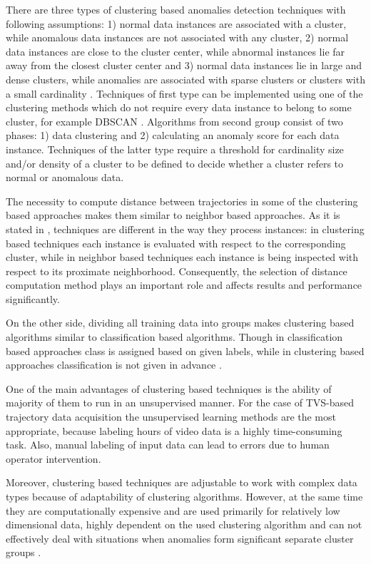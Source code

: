 There are three types of clustering based anomalies detection techniques with following assumptions: 1) normal data instances are associated with a cluster, while anomalous data instances are not associated with any cluster, 2) normal data instances are close to the cluster center, while abnormal instances lie far away from the closest cluster center and 3) normal data instances lie in large and dense clusters, while anomalies are associated with sparse clusters or clusters with a small cardinality \cite{article:15_survey_ad}\cite{article:6_survey_anom_det_rtuvs}. Techniques of first type can be implemented using one of the clustering methods which do not require every data instance to belong to some cluster, for example DBSCAN \cite{inproceedings:20_dbscan}. Algorithms from second group consist of two phases: 1) data clustering and 2) calculating an anomaly score for each data instance. Techniques of the latter type require a threshold for cardinality size and/or density of a cluster to be defined to decide whether a cluster refers to normal or anomalous data.

The necessity to compute distance between trajectories in some of the clustering based approaches makes them similar to neighbor based approaches. As it is stated in \cite{article:15_survey_ad}, techniques are different in the way they process instances: in clustering based techniques each instance is evaluated with respect to the corresponding cluster, while in neighbor based techniques each instance is being inspected with respect to its proximate neighborhood. Consequently, the selection of distance computation method plays an important role and affects results and performance significantly.

On the other side, dividing all training data into groups makes clustering based algorithms similar to classification based algorithms. Though in classification based approaches class is assigned based on given labels, while in clustering based approaches classification is not given in advance \cite{inproceedings:18_ardod_lstd}.

One of the main advantages of clustering based techniques is the ability of majority of them to run in an unsupervised manner. For the case of TVS-based trajectory data acquisition the unsupervised learning methods are the most appropriate, because labeling hours of video data is a highly time-consuming task. Also, manual labeling of input data can lead to errors due to human operator intervention.

Moreover, clustering based techniques are adjustable to work with complex data types because of adaptability of clustering algorithms. However, at the same time they are computationally expensive and are used primarily for relatively low dimensional data, highly dependent on the used clustering algorithm and can not effectively deal with situations when anomalies form significant separate cluster groups \cite{article:15_survey_ad}.

